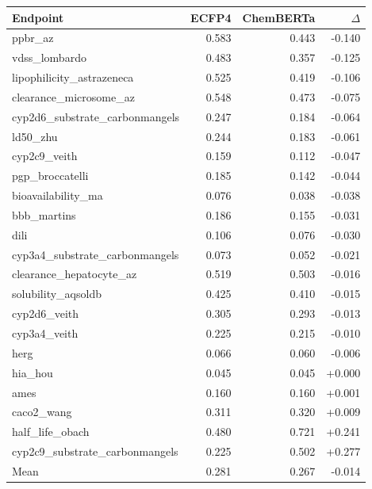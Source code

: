 \begin{tabular}{lrrr}
\toprule
Endpoint & ECFP4 & ChemBERTa & $\Delta$ \\
\midrule
ppbr\_az & 0.583 & 0.443 & -0.140 \\
vdss\_lombardo & 0.483 & 0.357 & -0.125 \\
lipophilicity\_astrazeneca & 0.525 & 0.419 & -0.106 \\
clearance\_microsome\_az & 0.548 & 0.473 & -0.075 \\
cyp2d6\_substrate\_carbonmangels & 0.247 & 0.184 & -0.064 \\
ld50\_zhu & 0.244 & 0.183 & -0.061 \\
cyp2c9\_veith & 0.159 & 0.112 & -0.047 \\
pgp\_broccatelli & 0.185 & 0.142 & -0.044 \\
bioavailability\_ma & 0.076 & 0.038 & -0.038 \\
bbb\_martins & 0.186 & 0.155 & -0.031 \\
dili & 0.106 & 0.076 & -0.030 \\
cyp3a4\_substrate\_carbonmangels & 0.073 & 0.052 & -0.021 \\
clearance\_hepatocyte\_az & 0.519 & 0.503 & -0.016 \\
solubility\_aqsoldb & 0.425 & 0.410 & -0.015 \\
cyp2d6\_veith & 0.305 & 0.293 & -0.013 \\
cyp3a4\_veith & 0.225 & 0.215 & -0.010 \\
herg & 0.066 & 0.060 & -0.006 \\
hia\_hou & 0.045 & 0.045 & +0.000 \\
ames & 0.160 & 0.160 & +0.001 \\
caco2\_wang & 0.311 & 0.320 & +0.009 \\
half\_life\_obach & 0.480 & 0.721 & +0.241 \\
cyp2c9\_substrate\_carbonmangels & 0.225 & 0.502 & +0.277 \\
\midrule
Mean & 0.281 & 0.267 & -0.014 \\
\bottomrule
\end{tabular}

